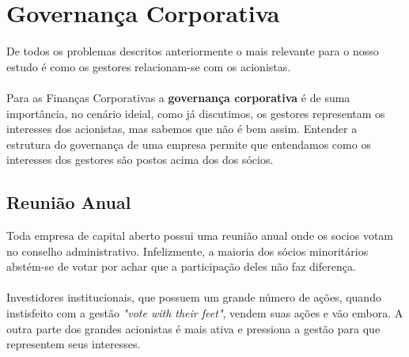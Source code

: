 \section{Governança Corporativa}
De todos os problemas descritos anteriormente o mais relevante para o nosso estudo é como os gestores relacionam-se com os acionistas.
\\~\\
Para as Finanças Corporativas a \textbf{governança corporativa} é de suma importância, no cenário ideial, como já discutimos, os gestores representam os interesses dos acionistas, mas sabemos que não é bem assim. Entender a estrutura do governança de uma empresa permite que entendamos como os interesses dos gestores são postos acima dos dos sócios.
\subsection*{Reunião Anual}
Toda empresa de capital aberto possui uma reunião anual onde os socios votam no conselho administrativo. Infelizmente, a maioria dos sócios minoritários abstém-se de votar por achar que a participação deles não faz diferença.
\\~\\
Investidores institucionais, que possuem um grande número de ações, quando instisfeito com a gestão \textit{"vote with their feet"}, vendem suas ações e vão embora. A outra parte dos grandes acionistas é mais ativa e pressiona a gestão para que representem seus interesses.
